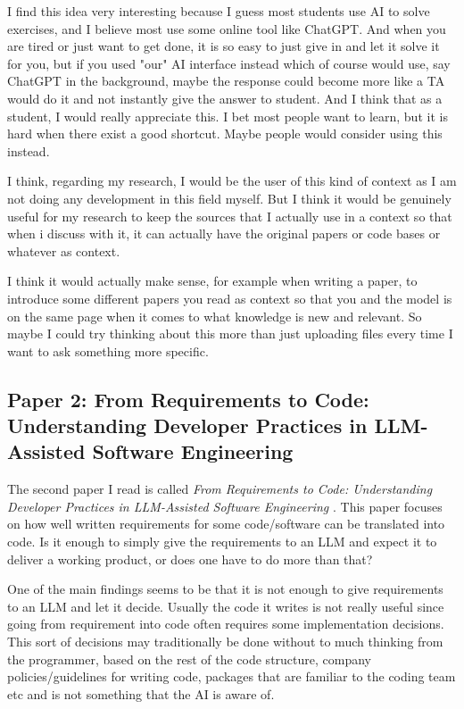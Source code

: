 \documentclass[11pt]{article}
\begin{document}
I find this idea very interesting because I guess most students use AI to solve exercises, and I believe most use some online tool like ChatGPT. And when you are tired or just want to get done, it is so easy to just give in and let it solve it for you, but if you used "our" AI interface instead which of course would use, say ChatGPT in the background, maybe the response could become more like a TA would do it and not instantly give the answer to student. And I think that as a student, I would really appreciate this. I bet most people want to learn, but it is hard when there exist a good shortcut. Maybe people would consider using this instead. 

I think, regarding my research, I would be the user of this kind of context as I am not doing any development in this field myself. But I think it would be genuinely useful for my research to keep the sources that I actually use in a context so that when i discuss with it, it can actually have the original papers or code bases or whatever as context.

I think it would actually make sense, for example when writing a paper, to introduce some different papers you read as context so that you and the model is on the same page when it comes to what knowledge is new and relevant. So maybe I could try thinking about this more than just uploading files every time I want to ask something more specific. 

\subsection{Paper 2: From Requirements to Code: Understanding Developer Practices in {LLM}-Assisted Software Engineering }
The second paper I read is called \textit{From Requirements to Code: Understanding Developer Practices in {LLM}-Assisted Software Engineering} \cite{ullrich_requirements_2025}. This paper focuses on how well written requirements for some code/software can be translated into code. Is it enough to simply give the requirements to an LLM and expect it to deliver a working product, or does one have to do more than that?

One of the main findings seems to be that it is not enough to give requirements to an LLM and let it decide. Usually the code it writes is not really useful since going from requirement into code often requires some implementation decisions. This sort of decisions may traditionally be done without to much thinking from the programmer, based on the rest of the code structure, company policies/guidelines for writing code, packages that are familiar to the coding team etc and is not something that the AI is aware of. 
\end{document}
